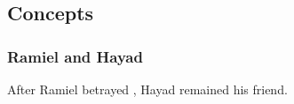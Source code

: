 \chapter[Twilight Angel, Remember]{\TwilightAngelRemember}
 

























\chapter{\TheKenosis}
























\chapter{\RamielsAwakeningBook}















\section{Concepts}









\subsection{Ramiel and Hayad}
After Ramiel betrayed \Belzir, Hayad remained his friend. 

